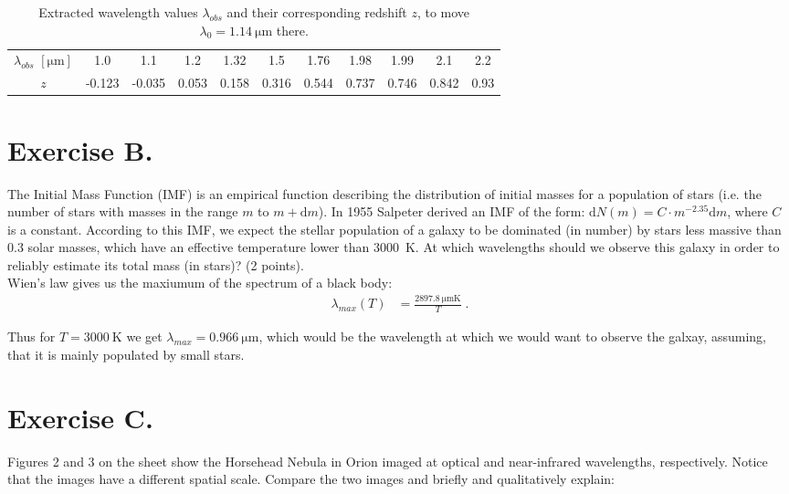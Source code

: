 \documentclass[11pt,a4paper,twoside]{article}
\begin{document}
\begin{table}[h!]
\begin{tabular}{ccccccccccc} \toprule
$\lambda_{obs}$ $[\si{\micro\meter}]$ & 1.0 & 1.1 & 1.2 & 1.32 & 1.5 & 1.76 & 1.98 & 1.99 & 2.1 & 2.2  \\
$z$ & -0.123 & -0.035 & 0.053 & 0.158 & 0.316 & 0.544 & 0.737 & 0.746 & 0.842 & 0.93  \\
\bottomrule
\end{tabular}
\caption{Extracted wavelength values $\lambda_{obs}$ and their corresponding
         redshift $z$, to move $\lambda_0 = \SI{1.14}{\micro\meter}$ there.}
\label{tab:l}
\end{table}


\section*{Exercise B.}

The Initial Mass Function (IMF) is an empirical function describing the
distribution of initial masses for a population of stars (i.e. the number of
stars with masses in the range $m$ to $m + \mathrm{d}m$). In 1955 Salpeter
derived an IMF of the form: $\mathrm{d}N(m) = C \cdot m^{-2.35}\mathrm{d}m$, where
$C$ is a constant. According to this IMF, we expect the stellar population of a
galaxy to be dominated (in number) by stars less massive than \num{0.3} solar
masses, which have an effective temperature lower than \SI{3000}{\kelvin}. At
which wavelengths should we observe this galaxy in order to reliably estimate
its total mass (in stars)? (2 points). \\

Wien's law gives us the maxiumum of the spectrum of a black body:
\begin{align}
\lambda_{max}(T) &= \frac{\SI{2897.8}{\micro\meter\kelvin}}{T} \;.
\label{eq:w}
\end{align}

Thus for $T=\SI{3000}{\kelvin}$ we get $\lambda_{max} =
\SI{0.966}{\micro\meter}$, which would be the wavelength at which we would want
to observe the galxay, assuming, that it is mainly populated by small stars.


\section*{Exercise C.}

Figures 2 and 3 on the sheet show the Horsehead Nebula in Orion imaged at
optical and near-infrared wavelengths, respectively. Notice that the images
have a different spatial scale.  Compare the two images and briefly and
qualitatively explain: \\
\end{document}
